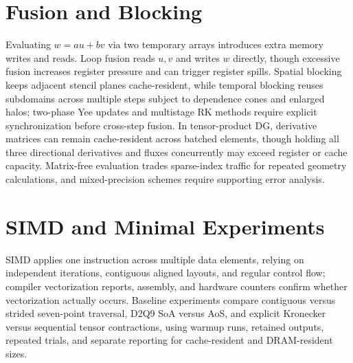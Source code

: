 \section{Fusion and Blocking}
Evaluating $w=a u+b v$ via two temporary arrays introduces extra memory writes and reads. Loop fusion reads $u,v$ and writes $w$ directly, though excessive fusion increases register pressure and can trigger register spills.
Spatial blocking keeps adjacent stencil planes cache-resident, while temporal blocking reuses subdomains across multiple steps subject to dependence cones and enlarged halos; two-phase Yee updates and multistage RK methods require explicit synchronization before cross-step fusion.
In tensor-product DG, derivative matrices can remain cache-resident across batched elements, though holding all three directional derivatives and fluxes concurrently may exceed register or cache capacity. Matrix-free evaluation trades sparse-index traffic for repeated geometry calculations, and mixed-precision schemes require supporting error analysis.
\section{SIMD and Minimal Experiments}
SIMD applies one instruction across multiple data elements, relying on independent iterations, contiguous aligned layouts, and regular control flow; compiler vectorization reports, assembly, and hardware counters confirm whether vectorization actually occurs.
Baseline experiments compare contiguous versus strided seven-point traversal, D2Q9 SoA versus AoS, and explicit Kronecker versus sequential tensor contractions, using warmup runs, retained outputs, repeated trials, and separate reporting for cache-resident and DRAM-resident sizes.
